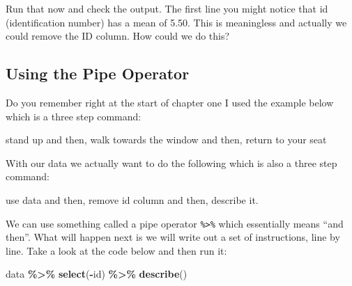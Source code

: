 \documentclass[
]{book}
\newenvironment{Shaded}{\begin{snugshade}}{\end{snugshade}}
\newcommand{\AttributeTok}[1]{\textcolor[rgb]{0.13,0.29,0.53}{#1}}
\newcommand{\FunctionTok}[1]{\textcolor[rgb]{0.13,0.29,0.53}{\textbf{#1}}}
\newcommand{\NormalTok}[1]{#1}
\newcommand{\SpecialCharTok}[1]{\textcolor[rgb]{0.81,0.36,0.00}{\textbf{#1}}}
\newcommand{\StringTok}[1]{\textcolor[rgb]{0.31,0.60,0.02}{#1}}
\let\oldsubsection\subsection
\renewcommand{\subsection}{\needspace{3\baselineskip}\oldsubsection}  %
\begin{document}
Run that now and check the output. The first line you might notice that id (identification number) has a mean of 5.50. This is meaningless and actually we could remove the ID column. How could we do this?

\subsection{Using the Pipe Operator}\label{using-the-pipe-operator}

Do you remember right at the start of chapter one I used the example below which is a three step command:

\begin{Shaded}
\begin{Highlighting}[]
\StringTok{\textasciigrave{}}\AttributeTok{stand up}\StringTok{\textasciigrave{}}\NormalTok{ and then,}
\StringTok{\textasciigrave{}}\AttributeTok{walk towards the window}\StringTok{\textasciigrave{}}\NormalTok{ and then,}
\StringTok{\textasciigrave{}}\AttributeTok{return to your seat}\StringTok{\textasciigrave{}}
\end{Highlighting}
\end{Shaded}

With our data we actually want to do the following which is also a three step command:

\begin{Shaded}
\begin{Highlighting}[]
\NormalTok{use }\StringTok{\textasciigrave{}}\AttributeTok{data}\StringTok{\textasciigrave{}}\NormalTok{ and then,}
\StringTok{\textasciigrave{}}\AttributeTok{remove id column}\StringTok{\textasciigrave{}}\NormalTok{ and then,}
\StringTok{\textasciigrave{}}\AttributeTok{describe}\StringTok{\textasciigrave{}}\NormalTok{ it.}
\end{Highlighting}
\end{Shaded}

We can use something called a pipe operator \texttt{\%\textgreater{}\%} which essentially means ``and then''. What will happen next is we will write out a set of instructions, line by line. Take a look at the code below and then run it:

\begin{Shaded}
\begin{Highlighting}[]
\NormalTok{data }\SpecialCharTok{\%\textgreater{}\%}
  \FunctionTok{select}\NormalTok{(}\SpecialCharTok{{-}}\NormalTok{id) }\SpecialCharTok{\%\textgreater{}\%}
  \FunctionTok{describe}\NormalTok{()}
\end{Highlighting}
\end{Shaded}
\end{document}
